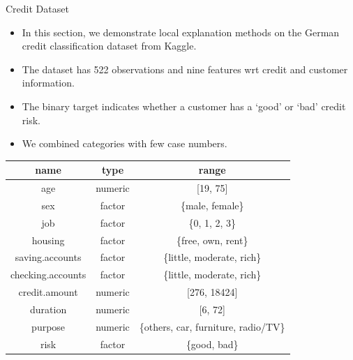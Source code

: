 \documentclass[aspectratio=169]{../latex_main/tntbeamer}  %
\begin{document}
\begin{frame}{Credit Dataset}
    \vspace{-2em}
	\begin{itemize}
		\item In this section, we demonstrate local explanation methods on the German credit classification dataset from Kaggle. \href{https://www.kaggle.com/uciml/german-credit}{}
		\item The dataset has 522 observations and nine features wrt credit and customer information.
		\item The binary target indicates whether a customer has a `good' or `bad' credit risk.  
		\item We combined categories with few case numbers. 
	\end{itemize}
		\begin{center}
			\footnotesize
			\begin{tabular}{ccc}
				\toprule
				name & type & range\\
				\midrule
				age & numeric & [19, 75]\\
				sex & factor & \{male, female\}\\
				job & factor & \{0, 1, 2, 3\}\\
				housing & factor & \{free, own, rent\}\\
				saving.accounts & factor & \{little, moderate, rich\}\\
				checking.accounts & factor & \{little, moderate, rich\}\\
				credit.amount & numeric & [276, 18424]\\
				duration & numeric &  [6, 72]\\
				purpose & numeric &  \{others, car, furniture, radio/TV\}\\
				risk & factor & \{good, bad\}\\
				\bottomrule
			\end{tabular}
		\end{center}
\end{frame}
\end{document}
